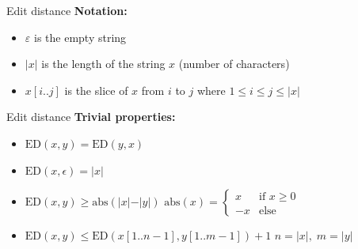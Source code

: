
\begin{frame}{Edit distance}
  \textbf{Notation:}
  \begin{itemize}
    \item<2->
      $\varepsilon$ is the empty string
    \item<3->
      $\vert x \vert$ is the length of the string $x$ (number of characters)
    \item<4->
      $x[i..j]$ is the slice of $x$ from $i$ to $j$ where
      $1 \leq i \leq j \leq \vert x \vert$
  \end{itemize}
  \begin{figure}[!h]
    \begin{adjustbox}{width=0.75\linewidth}
      
    \end{adjustbox}
  \end{figure}
\end{frame}


\begin{frame}{Edit distance}
  \textbf{Trivial properties:}
  \begin{itemize}
    \item<2->
      $\mathrm{ED}(x, y) = \mathrm{ED}(y, x)$
    \item<3->
      $\mathrm{ED}(x, \epsilon) = \vert x \vert$
    \item<4->
      $\mathrm{ED}(x, y) \geq \mathrm{abs}(\vert x \vert - \vert y \vert)$
      \hfill
      $\mathrm{abs}(x) = \begin{cases}
        x & \text{if } x \geq 0\\
        -x & \text{else}
      \end{cases}$
    \item<5->
      $\mathrm{ED}(x, y) \leq \mathrm{ED}(x[1..n-1], y[1..m-1]) + 1$
      \hfill
      $n = \vert x \vert, \; m = \vert y \vert$
  \end{itemize}
\end{frame}


